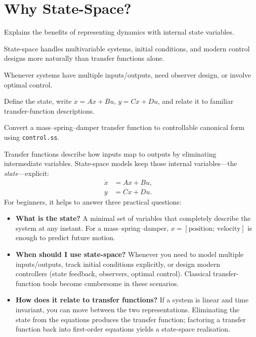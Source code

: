 \section{Why State-Space?}
\begin{beginnerguide}
    \item[\textbf{What?}] Explains the benefits of representing dynamics with internal state variables.
    \item[\textbf{Why?}] State-space handles multivariable systems, initial conditions, and modern control designs more naturally than transfer functions alone.
    \item[\textbf{When?}] Whenever systems have multiple inputs/outputs, need observer design, or involve optimal control.
    \item[\textbf{How?}] Define the state, write $\dot{x}=Ax+Bu$, $y=Cx+Du$, and relate it to familiar transfer-function descriptions.
    \item[\textbf{Example}] Convert a mass--spring--damper transfer function to controllable canonical form using \texttt{control.ss}.
\end{beginnerguide}
Transfer functions describe how inputs map to outputs by eliminating intermediate variables. State-space models keep those internal variables---the \emph{state}---explicit:
\begin{align}
    \dot{x} &= A x + B u,\\
    y &= C x + D u.
\end{align}
For beginners, it helps to answer three practical questions:
\begin{itemize}[leftmargin=*]
    \item \textbf{What is the state?} A minimal set of variables that completely describe the system at any instant. For a mass--spring--damper, $x = [\text{position};~\text{velocity}]$ is enough to predict future motion.
    \item \textbf{When should I use state-space?} Whenever you need to model multiple inputs/outputs, track initial conditions explicitly, or design modern controllers (state feedback, observers, optimal control). Classical transfer-function tools become cumbersome in these scenarios.
    \item \textbf{How does it relate to transfer functions?} If a system is linear and time invariant, you can move between the two representations. Eliminating the state from the equations produces the transfer function; factoring a transfer function back into first-order equations yields a state-space realisation.
\end{itemize}


